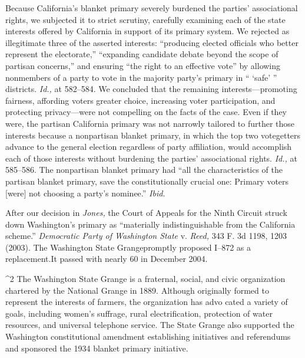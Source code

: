   Because California's blanket primary severely burdened the
parties' associational rights, we subjected it to strict scrutiny,
carefully examining each of the state interests offered by California in
support of its primary system. We rejected as illegitimate three of the
asserted interests: ``producing elected officials who better represent
the electorate,'' ``expanding candidate debate beyond the scope of
partisan concerns,'' and ensuring ``the right to an effective vote''
by allowing nonmembers of a party to vote in the majority party's
primary in `` ‘safe' '' districts. \emph{Id.,} at 582--584.
We concluded that the remaining interests---promoting fairness,
affording voters greater choice, increasing voter participation, and
protecting privacy---were not compelling on the facts of the case.
Even if they were, the partisan California primary was not narrowly
tailored to further those interests because a nonpartisan blanket
primary, in which the top two votegetters advance to the general
election regardless of party affiliation, would accomplish each
of those interests without burdening the parties' associational
rights. \emph{Id.,} at 585--586. The nonpartisan blanket primary had
``all the characteristics of the partisan blanket primary, save the
constitutionally crucial one: Primary voters [were] not choosing a
party's nominee.'' \emph{Ibid.}

  After our decision in \emph{Jones,} the Court of Appeals for the
Ninth Circuit struck down Washington's primary as ``materially
indistinguishable from the California scheme.'' \emph{Democratic Party
of Washington State} v. \emph{Reed,} 343 F. 3d 1198, 1203 (2003). The
Washington State Grange\footnotemark[2] promptly pro\newpage posed I--872 as a
replacement.It passed with nearly 60%
in December 2004.

^2 The Washington State Grange is a fraternal, social, and civic
organization chartered by the National Grange in 1889. Although
originally formed to represent the interests of farmers, the
organization has advo \newpage  cated a variety of goals, including
women's suffrage, rural electrification, protection of water
resources, and universal telephone service. The State Grange also
supported the Washington constitutional amendment establishing
initiatives and referendums and sponsored the 1934 blanket primary
initiative.

